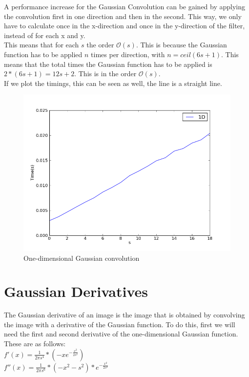 \documentclass[10pt,a4paper]{article}
\begin{document}
A performance increase for the Gaussian Convolution can be gained by
applying the convolution first in one direction and then in the
second. This way, we only have to calculate once in the x-direction and
once in the y-direction of the filter, instead of for each x and y.\\
This means that for each $s$ the order $\mathcal{O}(s)$. This is because
the Gaussian function has to be applied $n$ times per direction, with
$n = ceil(6s + 1)$. This means that the total times the Gaussian function
has to be applied is $2 * (6s + 1) = 12s + 2$. This is in the order 
$\mathcal{O}(s)$.\\
If we plot the timings, this can be seen as well, the line is a straight
line.
\begin{figure}[H]
	\includegraphics[scale=0.5]{1d.png}
	\caption{One-dimensional Gaussian convolution}
\end{figure}

\section{Gaussian Derivatives}

The Gaussian derivative of an image is the image that is obtained by
convolving the image with a derivative of the Gaussian function. To do this,
first we will need the first and second derivative of the one-dimensional
Gaussian function. These are as follows:\\
$f'(x) = \frac{1}{2\pi s^4} * (-xe^{-\frac{x^2}{2s^2}})$\\
$f''(x) = \frac{1}{2\pi s^6} * (-x^2 - s^2) * e^{-\frac{x^2}{2s^2}}$
\end{document}
